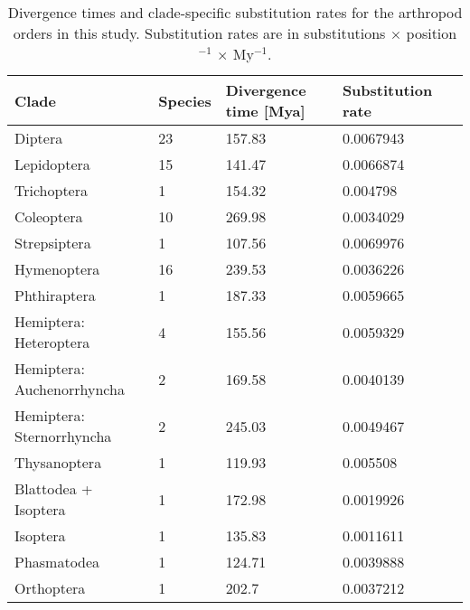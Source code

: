 \begin{table}
\centering
\caption[Divergence times and clade-specific substitution rates]{Divergence times and clade-specific substitution rates for the arthropod orders in this study. Substitution rates are in substitutions $\times$ position$^{-1}$ $\times$ My$^{-1}$.}
\label{tab:order-divergence-times}
\begin{tabular}{@{}lllll@{}}
\toprule
Clade                      & Species & Divergence time [Mya] & Substitution rate \\ \midrule
Diptera                    & 23      & 157.83                    & 0.0067943                     \\
Lepidoptera                & 15      & 141.47                    & 0.0066874                     \\
Trichoptera                & 1       & 154.32                    & 0.004798                      \\
Coleoptera                 & 10      & 269.98                    & 0.0034029                     \\
Strepsiptera               & 1       & 107.56                    & 0.0069976                     \\
Hymenoptera                & 16      & 239.53                    & 0.0036226                     \\
Phthiraptera               & 1       & 187.33                    & 0.0059665                     \\
Hemiptera: Heteroptera     & 4       & 155.56                    & 0.0059329                     \\
Hemiptera: Auchenorrhyncha & 2       & 169.58                    & 0.0040139                     \\
Hemiptera: Sternorrhyncha  & 2       & 245.03                    & 0.0049467                     \\
Thysanoptera               & 1       & 119.93                    & 0.005508                      \\
Blattodea + Isoptera       & 1       & 172.98                    & 0.0019926                     \\
Isoptera                   & 1       & 135.83                    & 0.0011611                     \\
Phasmatodea                & 1       & 124.71                    & 0.0039888                     \\
Orthoptera                 & 1       & 202.7                     & 0.0037212                     \\

\end{tabular}
\end{table}
